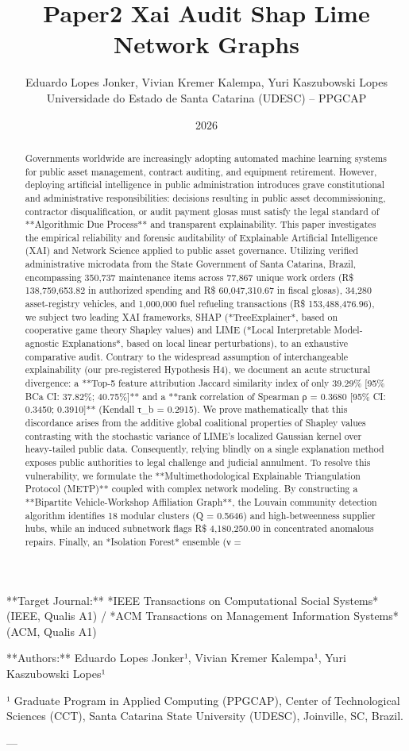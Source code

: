 \documentclass[10pt,a4paper,journal]{article}
\title{Paper2 Xai Audit Shap Lime Network Graphs}
\author{Eduardo Lopes Jonker, Vivian Kremer Kalempa, Yuri Kaszubowski Lopes\\ \small Universidade do Estado de Santa Catarina (UDESC) -- PPGCAP}
\date{2026}
\begin{document}
\maketitle

**Target Journal:** *IEEE Transactions on Computational Social Systems* (IEEE, Qualis A1) / *ACM Transactions on Management Information Systems* (ACM, Qualis A1)

**Authors:** Eduardo Lopes Jonker¹, Vivian Kremer Kalempa¹, Yuri Kaszubowski Lopes¹

¹ Graduate Program in Applied Computing (PPGCAP), Center of Technological Sciences (CCT), Santa Catarina State University (UDESC), Joinville, SC, Brazil.

---

\begin{abstract}
Governments worldwide are increasingly adopting automated machine learning systems for public asset management, contract auditing, and equipment retirement. However, deploying artificial intelligence in public administration introduces grave constitutional and administrative responsibilities: decisions resulting in public asset decommissioning, contractor disqualification, or audit payment glosas must satisfy the legal standard of **Algorithmic Due Process** and transparent explainability. This paper investigates the empirical reliability and forensic auditability of Explainable Artificial Intelligence (XAI) and Network Science applied to public asset governance. Utilizing verified administrative microdata from the State Government of Santa Catarina, Brazil, encompassing 350,737 maintenance items across 77,867 unique work orders (R\$ 138,759,653.82 in authorized spending and R\$ 60,047,310.67 in fiscal glosas), 34,280 asset-registry vehicles, and 1,000,000 fuel refueling transactions (R\$ 153,488,476.96), we subject two leading XAI frameworks, SHAP (*TreeExplainer*, based on cooperative game theory Shapley values) and LIME (*Local Interpretable Model-agnostic Explanations*, based on local linear perturbations), to an exhaustive comparative audit. Contrary to the widespread assumption of interchangeable explainability (our pre-registered Hypothesis H4), we document an acute structural divergence: a **Top-5 feature attribution Jaccard similarity index of only 39.29\% [95\% BCa CI: 37.82\%; 40.75\%]** and a **rank correlation of Spearman ρ = 0.3680 [95\% CI: 0.3450; 0.3910]** (Kendall τ\_b = 0.2915). We prove mathematically that this discordance arises from the additive global coalitional properties of Shapley values contrasting with the stochastic variance of LIME's localized Gaussian kernel over heavy-tailed public data. Consequently, relying blindly on a single explanation method exposes public authorities to legal challenge and judicial annulment. To resolve this vulnerability, we formulate the **Multimethodological Explainable Triangulation Protocol (METP)** coupled with complex network modeling. By constructing a **Bipartite Vehicle-Workshop Affiliation Graph**, the Louvain community detection algorithm identifies 18 modular clusters (Q = 0.5646) and high-betweenness supplier hubs, while an induced subnetwork flags R\$ 4,180,250.00 in concentrated anomalous repairs. Finally, an *Isolation Forest* ensemble (ν = 
\end{abstract}
\end{document}
